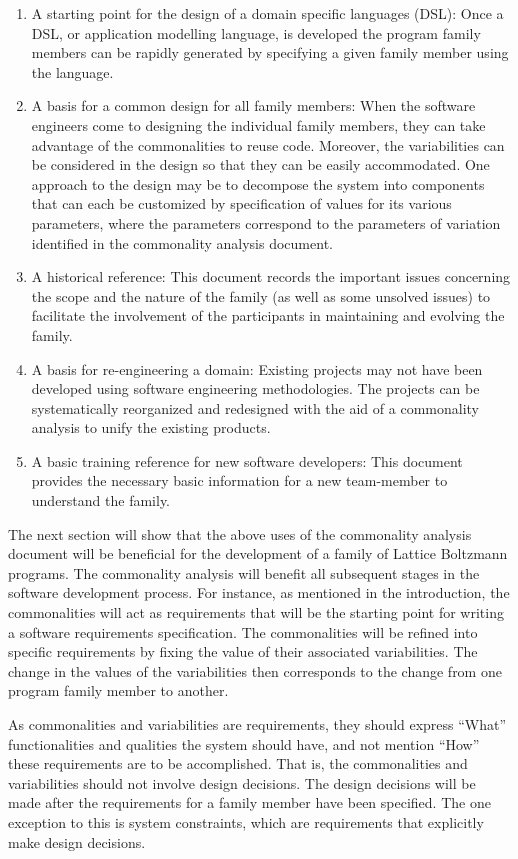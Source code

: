 \documentclass[12pt]{article}
\begin{document}
\begin{enumerate}
	\item A starting point for the design of a domain specific languages (DSL): Once a DSL, or application modelling language, is developed the program family members can be rapidly generated by specifying a given family member using the language.
	\item A basis for a common design for all family members: When the software engineers come to designing the individual family members, they can take advantage of the commonalities to reuse code. Moreover, the variabilities can be considered in the design so that they can be easily accommodated. One approach to the design may be to decompose the system into components that can each be customized by specification of values for its various parameters, where the parameters correspond to the parameters of variation identified in the commonality analysis document.
	\item A historical reference: This document records the important issues concerning the scope and the nature of the family (as well as some unsolved issues) to facilitate the involvement of the participants in maintaining and evolving the family.
	\item A basis for re-engineering a domain: Existing projects may not have been developed using software engineering methodologies. The projects can be systematically reorganized and redesigned with the aid of a commonality analysis to unify the existing products.
	\item A basic training reference for new software developers: This document provides the necessary basic information for a new team-member to understand the family. 
\end{enumerate}

The next section will show that the above uses of the commonality analysis document will be beneficial for the development of a family of Lattice Boltzmann programs. The commonality analysis will benefit all subsequent stages in the software development process. For instance, as mentioned in the introduction, the commonalities will act as requirements that will be the starting point for writing a software requirements specification. The commonalities will be refined into specific requirements by fixing the value of their associated variabilities. The change in the values of the variabilities then corresponds to the change from one program family member to another.

As commonalities and variabilities are requirements, they should express “What” functionalities and qualities the system should have, and not mention “How” these requirements are to be accomplished. That is, the commonalities and variabilities should not involve design decisions. The design decisions will be made after the requirements for a family member have been specified. The one exception to this is system constraints, which are requirements that explicitly make design decisions. 
\end{document}
